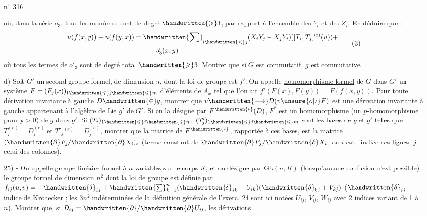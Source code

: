 \hfill n\textsuperscript{o} 316

où, dans la série $o_3$, tous les monômes sont de degré $\handwritten{\geqslant}3$, par rapport à l'ensemble des $Y_i$ et des $Z_i$. En déduire que :
\[
\begin{aligned}
u(f(x,y))-u(f(y,x))&=\handwritten{\sum}_{i\handwritten{<}j}(X_iY_j-X_jY_i)([T_i,T_j]^{(e)}(u))+\\
&\qquad +o'_3(x,y)
\end{aligned}\tag*{(3)}
\]
où tous les termes de $o'_3$ sont de degré total $\handwritten{\geqslant}3$. Montrer que si $G$ est commutatif, $g$ est commutative.

d) Soit $G'$ un second groupe formel, de dimension $n$, dont la loi de groupe est $f'$. On appelle \uline{homomorphisme formel} de $G$ dans $G'$ un système $F=(F_j(x))_{1\handwritten{\leqslant}j\handwritten{\leqslant}m}$ d'éléments de $A_x$ tel que l'on ait $f'(F(x),F(y))=F(f(x,y))$. Pour toute dérivation invariante à gauche $D\handwritten{\in}g$, montrer que $v\handwritten{\longrightarrow}D(v\unsure{o|\circ}F)$ est une dérivation invariante à gauche appartenant à l'algèbre de Lie $g'$ de $G'$. Si on la désigne par $F^{\handwritten{*}}(D)$, $F^*$ est un homomorphisme (un $p$-homomorphisme pour $p>0$) de $g$ dans $g'$. Si $(T_i)_{1\handwritten{\leqslant}i\handwritten{\leqslant}n}$, $(T'_j)_{1\handwritten{\leqslant}j\handwritten{\leqslant}m}$ sont les bases de $g$ et $g'$ telles que $T_i^{(e)}=D_i^{(e)}$ et $T'_j{}^{(e)}=D_j^{(e)}$, montrer que la matrice de $F^{\handwritten{*}}$, rapportée à ces bases, est la matrice $(\handwritten{\partial}F_j/\handwritten{\partial}X_i)_c$ (terme constant de $\handwritten{\partial}F_j/\handwritten{\partial}X_i$, où $i$ est l'indice des lignes, $j$ celui des colonnes).

25) - On appelle \uline{groupe linéaire formel} à $n$ variables sur le corps $K$, et on désigne par $\mathrm{GL}(n,K)$ (lorsqu'aucune confusion n'est possible) le groupe formel de dimension $n^2$ dont la loi de groupe est définie par $f_{ij}(u,v)=-\handwritten{\delta}_{ij}+\handwritten{\sum}_{k=1}^{n}(\handwritten{\delta}_{ik}+U_{ik})(\handwritten{\delta}_{kj}+V_{kj})$ ($\handwritten{\delta}_{ij}$ indice de Kronecker ; les $3n^2$ indéterminées de la définition générale de l'exerc. 24 sont ici notées $U_{ij}$, $V_{ij}$, $W_{ij}$ avec 2 indices variant de 1 à $n$). Montrer que, si $D_{ij}=\handwritten{\partial}/\handwritten{\partial}U_{ij}$, les dérivations
